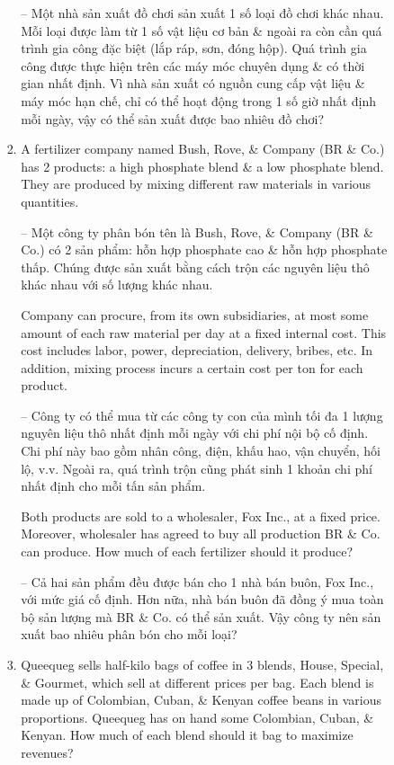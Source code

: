 \documentclass{article}
\begin{document}
\begin{itemize}
\begin{itemize}
\begin{itemize}
\begin{enumerate}
                -- Một nhà sản xuất đồ chơi sản xuất 1 số loại đồ chơi khác nhau. Mỗi loại được làm từ 1 số vật liệu cơ bản \& ngoài ra còn cần quá trình gia công đặc biệt (lắp ráp, sơn, đóng hộp). Quá trình gia công được thực hiện trên các máy móc chuyên dụng \& có thời gian nhất định. Vì nhà sản xuất có nguồn cung cấp vật liệu \& máy móc hạn chế, chỉ có thể hoạt động trong 1 số giờ nhất định mỗi ngày, vậy có thể sản xuất được bao nhiêu đồ chơi?
                \item A fertilizer company named Bush, Rove, \& Company (BR \& Co.) has 2 products: a high phosphate blend \& a low phosphate blend. They are produced by mixing different raw materials in various quantities.

                -- Một công ty phân bón tên là Bush, Rove, \& Company (BR \& Co.) có 2 sản phẩm: hỗn hợp phosphate cao \& hỗn hợp phosphate thấp. Chúng được sản xuất bằng cách trộn các nguyên liệu thô khác nhau với số lượng khác nhau.

                Company can procure, from its own subsidiaries, at most some amount of each raw material per day at a fixed internal cost. This cost includes labor, power, depreciation, delivery, bribes, etc. In addition, mixing process incurs a certain cost per ton for each product.

                -- Công ty có thể mua từ các công ty con của mình tối đa 1 lượng nguyên liệu thô nhất định mỗi ngày với chi phí nội bộ cố định. Chi phí này bao gồm nhân công, điện, khấu hao, vận chuyển, hối lộ, v.v. Ngoài ra, quá trình trộn cũng phát sinh 1 khoản chi phí nhất định cho mỗi tấn sản phẩm.

                Both products are sold to a wholesaler, Fox Inc., at a fixed price. Moreover, wholesaler has agreed to buy all production BR \& Co. can produce. How much of each fertilizer should it produce?

                -- Cả hai sản phẩm đều được bán cho 1 nhà bán buôn, Fox Inc., với mức giá cố định. Hơn nữa, nhà bán buôn đã đồng ý mua toàn bộ sản lượng mà BR \& Co. có thể sản xuất. Vậy công ty nên sản xuất bao nhiêu phân bón cho mỗi loại?
                \item Queequeg sells half-kilo bags of coffee in 3 blends, House, Special, \& Gourmet, which sell at different prices per bag. Each blend is made up of Colombian, Cuban, \& Kenyan coffee beans in various proportions. Queequeg has on hand some Colombian, Cuban, \& Kenyan. How much of each blend should it bag to maximize revenues?


\end{enumerate}
\end{itemize}
\end{itemize}
\end{itemize}
\end{document}
